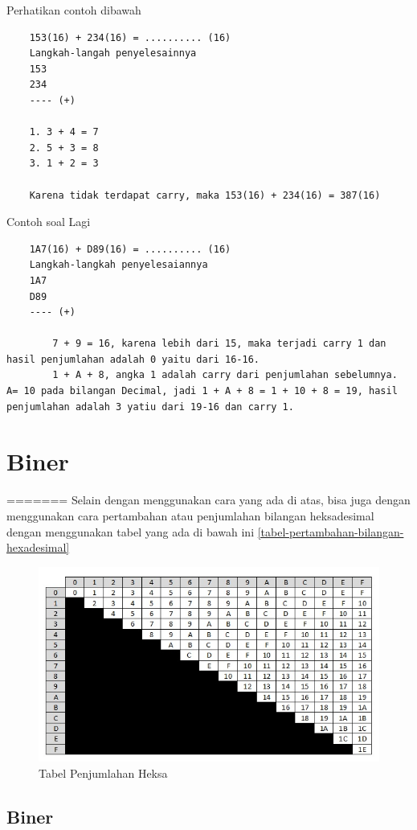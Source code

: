 	Perhatikan contoh dibawah
\begin{verbatim}
	153(16) + 234(16) = .......... (16) 
	Langkah-langah penyelesainnya
	153 
	234 
	---- (+)

	1. 3 + 4 = 7
	2. 5 + 3 = 8
	3. 1 + 2 = 3

	Karena tidak terdapat carry, maka 153(16) + 234(16) = 387(16)
\end{verbatim}
	Contoh soal Lagi 
\begin{verbatim}
	1A7(16) + D89(16) = .......... (16)
	Langkah-langkah penyelesaiannya
	1A7
	D89
	---- (+)

		7 + 9 = 16, karena lebih dari 15, maka terjadi carry 1 dan hasil penjumlahan adalah 0 yaitu dari 16-16.
		1 + A + 8, angka 1 adalah carry dari penjumlahan sebelumnya. A= 10 pada bilangan Decimal, jadi 1 + A + 8 = 1 + 10 + 8 = 19, hasil penjumlahan adalah 3 yatiu dari 19-16 dan carry 1.
\end{verbatim}	
	

\section {Biner}
=======
	Selain dengan menggunakan cara yang ada di atas, bisa juga dengan menggunakan cara pertambahan atau penjumlahan bilangan heksadesimal dengan menggunakan tabel yang ada di bawah ini \ref{tabel-pertambahan-bilangan-hexadesimal}
			\begin{figure} [ht]
				\centerline{\includegraphics[width=1\textwidth]{figures/tabel-pertambahan-bilangan-hexadesimal.jpg}}

\caption{Tabel Penjumlahan Heksa}
				\label{Tabel-Penjumlahan-Heksa}
			\end{figure}

\subsection {Biner}

